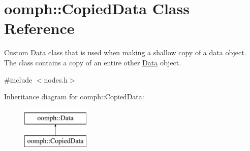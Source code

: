 \hypertarget{classoomph_1_1CopiedData}{}\section{oomph\+:\+:Copied\+Data Class Reference}
\label{classoomph_1_1CopiedData}


Custom \hyperlink{classoomph_1_1Data}{Data} class that is used when making a shallow copy of a data object. The class contains a copy of an entire other \hyperlink{classoomph_1_1Data}{Data} object.  




{\ttfamily \#include $<$nodes.\+h$>$}

Inheritance diagram for oomph\+:\+:Copied\+Data\+:\begin{figure}[H]
\begin{center}
\leavevmode
\includegraphics[height=2.000000cm]{classoomph_1_1CopiedData}
\end{center}
\end{figure}
